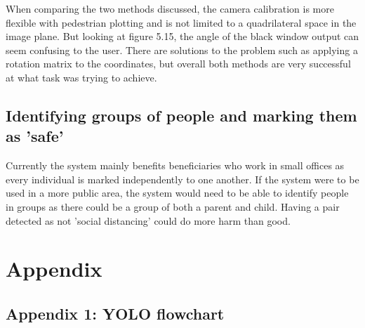 \documentclass[12pt]{report}
\begin{document}
\vspace{2mm}

When comparing the two methods discussed, the camera calibration is more flexible with pedestrian plotting and is not limited to a quadrilateral space in the image plane. But looking at figure 5.15, the angle of the black window output can seem confusing to the user. There are solutions to the problem such as applying a rotation matrix to the coordinates, but overall both methods are very successful at what task was trying to achieve.

\section{Identifying groups of people and marking them as ’safe’}

Currently the system mainly benefits beneficiaries who work in small offices as every individual is marked independently to one another. If the system were to be used in a more public area, the system would need to be able to identify people in groups as there could be a group of both a parent and child. Having a pair detected as not 'social distancing' could do more harm than good.



\chapter*{Appendix}

\section*{Appendix 1: YOLO flowchart}
\end{document}
